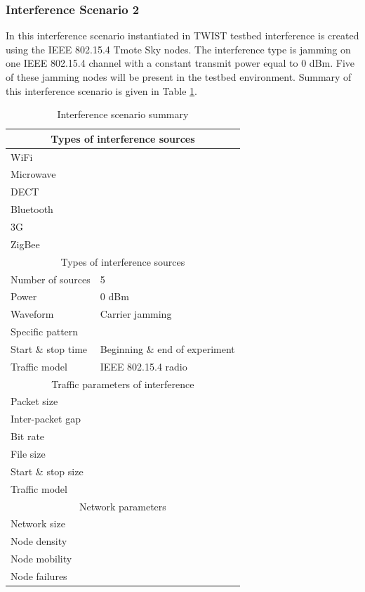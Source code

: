 \documentclass[11pt,a4paper,headinclude,footinclude,chapterprefix=on]{scrreprt}
\begin{document}
\subsubsection{Interference Scenario 2}In this interference scenario instantiated in TWIST testbed interference is created using the IEEE 802.15.4 Tmote Sky nodes. The interference type is jamming on one IEEE 802.15.4 channel with a constant transmit power equal to 0 dBm. Five of these jamming nodes will be present in the testbed environment. Summary of this interference scenario is given in Table \ref{tb:interf:2}.
\begin{table}
	[h] \centering \caption{Interference scenario summary} \label{tb:interf:2} 
	\begin{tabular}
		{|l|l|} \hline \multicolumn{2}{|c|}{Types of interference sources} \\
		\hline WiFi & \texttimes \\
		Microwave & \texttimes \\
		DECT & \texttimes \\
		Bluetooth & \texttimes \\
		3G & \texttimes \\
		ZigBee & \checkmark \\
		\hline \multicolumn{2}{|c|}{Types of interference sources} \\
		\hline Number of sources & 5 \\
		Power & 0 dBm \\
		Waveform & Carrier jamming \\
		Specific pattern & \\
		Start \& stop time & Beginning \& end of experiment \\
		Traffic model & IEEE 802.15.4 radio \\
		\hline \multicolumn{2}{|c|}{Traffic parameters of interference} \\
		\hline Packet size & \\
		Inter-packet gap & \\
		Bit rate & \\
		File size & \\
		Start \& stop size & \\
		Traffic model & \\
		\hline \multicolumn{2}{|c|}{Network parameters} \\
		\hline Network size & \\
		Node density & \\
		Node mobility & \\
		Node failures & \\
		\hline 
	\end{tabular}
\end{table}
\end{document}
